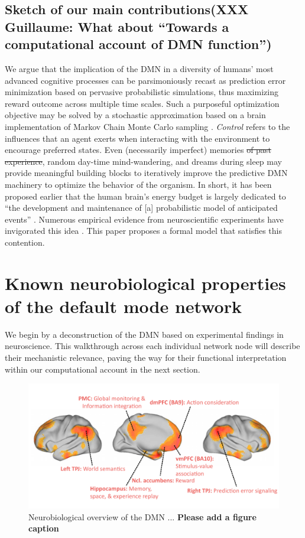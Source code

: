 \documentclass[10pt,letterpaper]{article}
\newcommand{\suggestremove}[1]{{\color{red} \sout{#1}}}
\begin{document}
\subsection{Sketch of our main contributions\textbf{(XXX Guillaume: What about ``Towards a computational account of DMN function'')}}
We argue that the implication of the DMN in a
diversity of humans' most advanced cognitive processes
can be parsimoniously recast as prediction error minimization
based on pervasive probabilistic simulations,
thus maximizing reward outcome across multiple time scales.
Such a purposeful optimization objective
may be solved by a stochastic approximation
based on a brain implementation of Markov Chain Monte Carlo sampling
\citep{tenenbaum2011grow}.
\textit{Control} refers to the influences that an agent exerts when interacting
with the environment to encourage preferred states.
Even (necessarily imperfect) memories
\suggestremove{of past experience}, random day-time mind-wandering, and dreams during sleep
may provide meaningful building blocks to iteratively improve
the predictive DMN machinery to optimize the behavior of the organism.
%
In short, it has been proposed earlier that
the human brain's energy budget is largely dedicated to
``the development and maintenance of [a]
probabilistic model of anticipated events''
\citep{raichle2005intrinsic}.
Numerous empirical evidence from
neuroscientific experiments have invigorated this idea \citep{kording2004bayesian, fiser2004small}.
This paper proposes a formal model that satisfies this contention.




\section{Known neurobiological properties of the default mode network}
We begin by a deconstruction of the DMN based on experimental findings in neuroscience. This walkthrough across each individual network node will describe their mechanistic relevance, paving the way for their functional interpretation within our computational account in the next section.

\begin{figure}[!h]
  \includegraphics[width=.9\linewidth]{neurobiological_overview_DMN.pdf}
  \caption{Neurobiological overview of the DMN ... \textbf{Please add a figure caption}}
  \label{fig:neurobiological_overview_DMN}
\end{figure}
%
\end{document}
